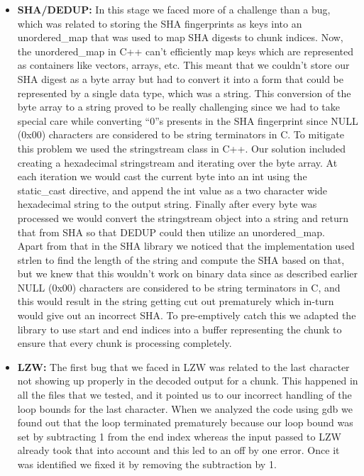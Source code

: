 \documentclass[../main.tex]{subfiles}
\begin{document}
\begin{enumerate}
\begin{itemize}
    \item \textbf{SHA/DEDUP:} In this stage we faced more of a challenge than a bug, which was related to storing the SHA fingerprints as keys into an unordered\_map that was used to map SHA digests to chunk indices. Now, the unordered\_map in C++ can’t efficiently map keys which are represented as containers like vectors, arrays, etc. This meant that we couldn’t store our SHA digest as a byte array but had to convert it into a form that could be represented by a single data type, which was a string. This conversion of the byte array to a string proved to be really challenging since we had to take special care while converting “0”s presents in the SHA fingerprint since NULL (0x00) characters are considered to be string terminators in C. To mitigate this problem we used the stringstream class in C++. Our solution included creating a hexadecimal stringstream and iterating over the byte array. At each iteration we would cast the current byte into an int using the static\_cast directive, and append the int value as a two character wide hexadecimal string to the output string. Finally after every byte was processed we would convert the stringstream object into a string and return that from SHA so that DEDUP could then utilize an unordered\_map. \\
    
    Apart from that in the SHA library we noticed that the implementation used strlen to find the length of the string and compute the SHA based on that, but we knew that this wouldn’t work on binary data since as described earlier NULL (0x00) characters are considered to be string terminators in C, and this would result in the string getting cut out prematurely which in-turn would give out an incorrect SHA. To pre-emptively catch this we adapted the library to use start and end indices into a buffer representing the chunk to ensure that every chunk is processing completely. \\

    \item \textbf{LZW:} The first bug that we faced in LZW was related to the last character not showing up properly in the decoded output for a chunk. This happened in all the files that we tested, and it pointed us to our incorrect handling of the loop bounds for the last character. When we analyzed the code using gdb we found out that the loop terminated prematurely because our loop bound was set by subtracting 1 from the end index whereas the input passed to LZW already took that into account and this led to an off by one error. Once it was identified we fixed it by removing the subtraction by 1. \\
    

\end{itemize}
\end{enumerate}
\end{document}
